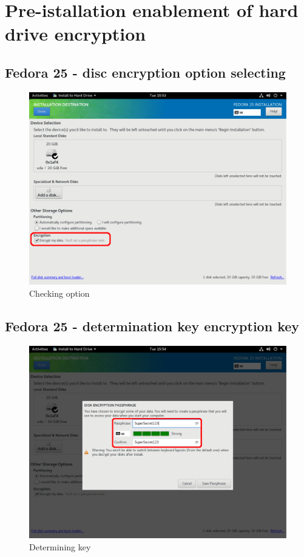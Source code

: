 \chapter{Pre-istallation enablement of hard drive encryption}
\label{luksinstall}

\section{Fedora 25 - disc encryption option selecting }

\begin{figure}[h]
    \centering
    \includegraphics[scale=0.42]{figures/FedoraInstall1.pdf}
    \caption{Checking option}
\end{figure}

\newpage

\section{Fedora 25 - determination key encryption key }

\begin{figure}[h]
    \centering
    \includegraphics[scale=0.42]{figures/FedoraInstall2.pdf}
    \caption{Determining key}
\end{figure}
